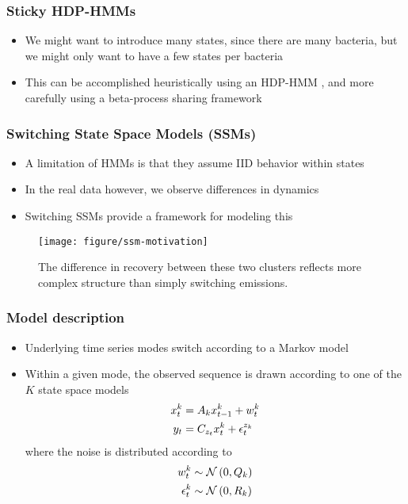 \documentclass{beamer}
\begin{document}
\begin{frame}
  \frametitle{Sticky HDP-HMMs}
 \begin{itemize}
 \item We might want to introduce many states, since there are many bacteria,
   but we might only want to have a few states per bacteria
 \item This can be accomplished heuristically using an HDP-HMM \citep{fox2007sticky}, and more
   carefully using a beta-process sharing framework \citep{fox2009sharing}
 \end{itemize} 
\end{frame}

\begin{frame}
  \frametitle{Switching State Space Models (SSMs)}
 \begin{itemize}
 \item A limitation of HMMs is that they assume IID behavior within states
 \item In the real data however, we observe differences in dynamics
 \item Switching SSMs provide a framework for modeling this \citep{ghahramani2000variational}
 \end{itemize} 

\begin{figure}[ht]
  \centering
  \texttt{[image: figure/ssm-motivation]}
  \caption{The difference in recovery between these two clusters reflects more
    complex structure than simply switching
    emissions. \label{fig:ssm-motivation}}
\end{figure}

\end{frame}

\begin{frame}
  \frametitle{Model description}
\begin{itemize}
\item Underlying time series modes switch according to a Markov model
\item Within a given mode, the observed sequence is drawn according to one of
  the $K$ state space models
  \begin{align*}
    x^{k}_{t} &= A_{k}x_{t - 1}^{k} + w^{k}_{t} \\
    y_{t} &= C_{z_{t}}x_{t}^{k} + \epsilon_{t}^{z_{k}}
    \end{align*}
  where the noise is distributed according to
  \begin{align*}
    w^{k}_{t} &\sim \mathcal{N}\left(0, Q_{k}\right) \\
    \epsilon^{k}_{t} &\sim \mathcal{N}\left(0, R_{k}\right)
  \end{align*}
\end{itemize}
\end{frame}
\end{document}

